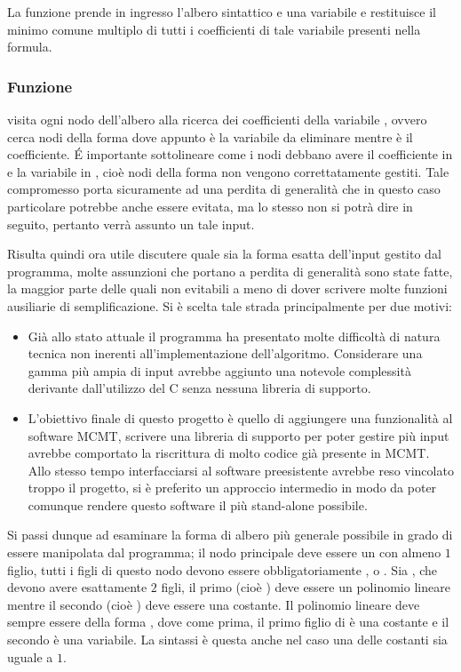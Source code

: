 \documentclass[11pt,letterpaper,twoside]{article}
\begin{document}
La funzione  prende in ingresso l'albero sintattico e una
variabile e restituisce il minimo comune multiplo di tutti i coefficienti di
tale variabile presenti nella formula.

\subsubsection{Funzione } 

 visita ogni nodo dell'albero alla ricerca dei coefficienti della
variabile , ovvero cerca nodi della forma  dove
appunto  è la variabile da eliminare mentre  è il
coefficiente. \'E importante sottolineare come i nodi debbano avere il
coefficiente in  e la variabile in , cioè
nodi della forma  non vengono correttatamente gestiti.  Tale
compromesso porta sicuramente ad una perdita di generalità che in questo caso
particolare potrebbe anche essere evitata, ma lo stesso non si potrà dire in
seguito, pertanto verrà assunto un tale input.

Risulta quindi ora utile discutere quale sia la forma esatta dell'input gestito
dal programma, molte assunzioni che portano a perdita di generalità sono state
fatte, la maggior parte delle quali non evitabili a meno di dover scrivere molte
funzioni ausiliarie di semplificazione. Si è scelta tale strada principalmente
per due motivi:

\begin{itemize}
  \item Già allo stato attuale il programma ha presentato molte difficoltà di
natura tecnica non inerenti all'implementazione dell'algoritmo. Considerare una
gamma più ampia di input avrebbe aggiunto una notevole complessità derivante
dall'utilizzo del C senza nessuna libreria di supporto.
  \item L'obiettivo finale di questo progetto è quello di aggiungere una
funzionalità al software MCMT\autocite{mcmt}, scrivere una libreria di supporto
per poter gestire più input avrebbe comportato la riscrittura di molto codice
già presente in MCMT. Allo stesso tempo interfacciarsi al software preesistente
avrebbe reso vincolato troppo il progetto, si è preferito un approccio
intermedio in modo da poter comunque rendere questo software il più stand-alone
possibile.
\end{itemize}

Si passi dunque ad esaminare la forma di albero più generale possibile in grado
di essere manipolata dal programma; il nodo principale deve essere un
 con almeno $1$ figlio, tutti i figli di questo nodo devono essere
obbligatoriamente \inline{=}, \inline{>} o .  Sia \inline{=},
\inline{>} che  devono avere esattamente $2$ figli, il primo (cioè
) deve essere un polinomio lineare mentre il secondo (cioè
) deve essere una costante. Il polinomio lineare deve sempre
essere della forma , dove come
prima, il primo figlio di \inline{*} è una costante e il secondo è una
variabile. La sintassi è questa anche nel caso una delle costanti sia uguale a
$1$.
\end{document}
